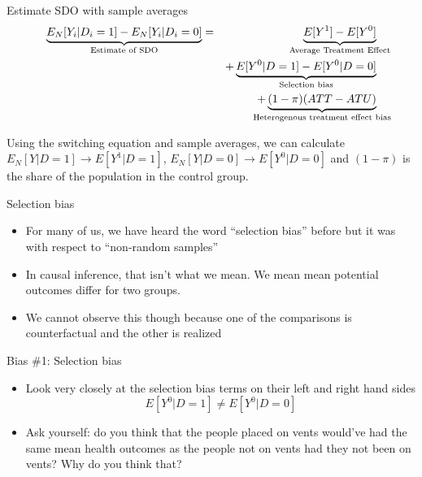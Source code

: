 \documentclass{beamer}
\begin{document}
\begin{frame}[plain]

  \begin{block}{Estimate SDO with sample averages}
    \begin{eqnarray*}
      \underbrace{E_N[Y_i | D_i=1] - E_N[Y_i | D_i=0]}_{ \mathclap{\text{Estimate of SDO}}}&=& \underbrace{E[Y^1] - E[Y^0]}_{ \mathclap{\text{Average Treatment Effect}}} \\
      &&+ \underbrace{E[Y^0|D=1] - E[Y^0 | D=0]}_{ \mathclap{\text{Selection bias}}}  \\
      && + \underbrace{(1-\pi)(ATT - ATU)}_{ \mathclap{\text{Heterogenous treatment effect bias}}}
    \end{eqnarray*}
  \end{block}

\bigskip

    Using the switching equation and sample averages, we can calculate $E_N[Y|D=1] \to E[Y^1 | D=1]$, $E_N[Y|D=0] \to E[Y^0|D=0]$ and $(1-\pi)$ is the share of the population in the control group.

\end{frame}


\begin{frame}{Selection bias}

\begin{itemize}
\item For many of us, we have heard the word ``selection bias'' before but it was with respect to ``non-random samples''
\item In causal inference, that isn't what we mean.  We mean mean potential outcomes differ for two groups.
\item We cannot observe this though because one of the comparisons is counterfactual and the other is realized
\end{itemize}

\end{frame}

\begin{frame}{Bias \#1: Selection bias}

  \begin{itemize}
    \item Look very closely at the selection bias terms on their left and right hand sides $$E[Y^0|D=1] \neq E[Y^0 |D=0]$$
    \item Ask yourself: do you think that the people placed on vents would've had the same mean health outcomes as the people not on vents had they not been on vents? Why do you think that?
      \end{itemize}

\end{frame}
\end{document}
